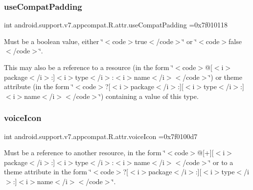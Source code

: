 \subsubsection{\texorpdfstring{use\+Compat\+Padding}{useCompatPadding}}
{\footnotesize\ttfamily int android.\+support.\+v7.\+appcompat.\+R.\+attr.\+use\+Compat\+Padding =0x7f010118\hspace{0.3cm}{\ttfamily [static]}}

Must be a boolean value, either \char`\"{}$<$code$>$true$<$/code$>$\char`\"{} or \char`\"{}$<$code$>$false$<$/code$>$\char`\"{}. 

This may also be a reference to a resource (in the form \char`\"{}$<$code$>$@\mbox{[}$<$i$>$package$<$/i$>$\+:\mbox{]}$<$i$>$type$<$/i$>$\+:$<$i$>$name$<$/i$>$$<$/code$>$\char`\"{}) or theme attribute (in the form \char`\"{}$<$code$>$?\mbox{[}$<$i$>$package$<$/i$>$\+:\mbox{]}\mbox{[}$<$i$>$type$<$/i$>$\+:\mbox{]}$<$i$>$name$<$/i$>$$<$/code$>$\char`\"{}) containing a value of this type. \mbox{\label{classandroid_1_1support_1_1v7_1_1appcompat_1_1R_1_1attr_ad6aa346699af6c2cc1b3a74ac7e59f41}} 
\subsubsection{\texorpdfstring{voice\+Icon}{voiceIcon}}
{\footnotesize\ttfamily int android.\+support.\+v7.\+appcompat.\+R.\+attr.\+voice\+Icon =0x7f0100d7\hspace{0.3cm}{\ttfamily [static]}}

Must be a reference to another resource, in the form \char`\"{}$<$code$>$@\mbox{[}+\mbox{]}\mbox{[}$<$i$>$package$<$/i$>$\+:\mbox{]}$<$i$>$type$<$/i$>$\+:$<$i$>$name$<$/i$>$$<$/code$>$\char`\"{} or to a theme attribute in the form \char`\"{}$<$code$>$?\mbox{[}$<$i$>$package$<$/i$>$\+:\mbox{]}\mbox{[}$<$i$>$type$<$/i$>$\+:\mbox{]}$<$i$>$name$<$/i$>$$<$/code$>$\char`\"{}. \mbox{\label{classandroid_1_1support_1_1v7_1_1appcompat_1_1R_1_1attr_ad4cb7154b0f22de4c1ea343bc2999284}} 
